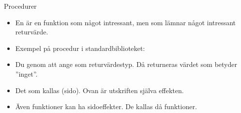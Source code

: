 \documentclass{simpleslides}
\begin{document}

\begin{Slide}{Procedurer}\SlideFontSmall
\begin{itemize}
\item En  är en funktion som  något intressant, men som  lämnar något intressant returvärde.
\item Exempel på procedur i standardbiblioteket: 
\item Du  genom att ange \texttt{} som returvärdestyp. Då returneras värdet \texttt{\Alert{()}} som betyder ''inget''.
\end{itemize}
\begin{itemize}
\item Det som  kallas (sido). Ovan är utskriften själva effekten.
\item Även funktioner kan ha sidoeffekter. De kallas då  funktioner.
\end{itemize}
\end{Slide}
\end{document}
